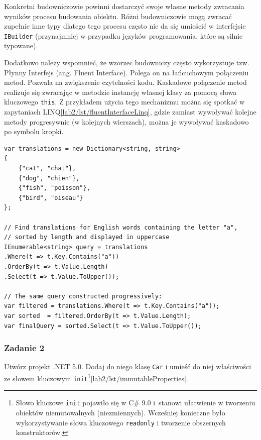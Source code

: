 Konkretni budowniczowie powinni dostarczyć swoje własne metody zwracania wyników procesu budowania obiektu. Różni budowniczowie mogą zwracać zupełnie inne typy dlatego tego procesu często nie da się umieścić w interfejsie \texttt{IBuilder} (przynajmniej w przypadku języków programowania, które są silnie typowane). 
 
Dodatkowo należy wspomnieć, że wzorzec budowniczy często wykorzystuje tzw. Płynny Interfejs (ang. Fluent Interface). Polega on na łańcuchowym połączeniu metod. Pozwala na zwiększenie czytelności kodu. Kaskadowe połączenie metod realizuje się zwracając w metodzie instancję własnej klasy za pomocą słowa kluczowego \texttt{this}. Z przykładem użycia tego mechanizmu można się spotkać w zapytaniach LINQ\ref{lab2/lst/fluentInterfaceLinq}, gdzie zamiast wywoływać kolejne metody progresywnie (w kolejnych wierszach), można je wywoływać kaskadowo po symbolu kropki. 

\begin{lstlisting}[caption={Wykorzystanie płynnych interfejsów w zapytania LINQ}, label={lab2/lst/fluentInterfaceLinq}]
var translations = new Dictionary<string, string>
{
	{"cat", "chat"},
	{"dog", "chien"},
	{"fish", "poisson"},
	{"bird", "oiseau"}
};

// Find translations for English words containing the letter "a",
// sorted by length and displayed in uppercase
IEnumerable<string> query = translations
.Where(t => t.Key.Contains("a"))
.OrderBy(t => t.Value.Length)
.Select(t => t.Value.ToUpper());

// The same query constructed progressively:
var filtered = translations.Where(t => t.Key.Contains("a"));
var sorted  = filtered.OrderBy(t => t.Value.Length);
var finalQuery = sorted.Select(t => t.Value.ToUpper());
\end{lstlisting}

\subsubsection{Zadanie 2}

Utwórz projekt .NET 5.0. Dodaj do niego klasę \texttt{Car} i umieść do niej właściwości ze słowem kluczowym \texttt{init}\footnote{Słowo kluczowe \texttt{init} pojawiło się w C\# 9.0 i~stanowi ułatwienie w tworzeniu obiektów niemutowalnych (niezmiennych). Wcześniej konieczne było wykorzystywanie słowa kluczowego \texttt{readonly} i tworzenie obszernych konstruktorów.}\ref{lab2/lst/immutableProperties}.


